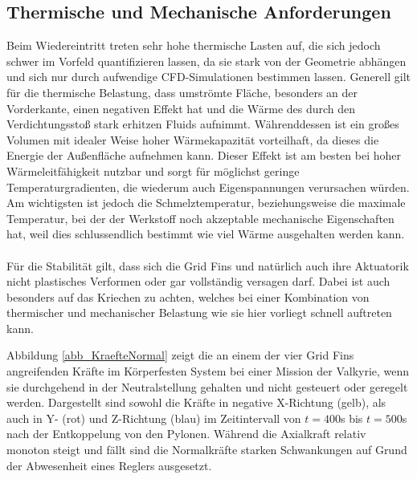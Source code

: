 \subsection{Thermische und Mechanische Anforderungen}
Beim Wiedereintritt treten sehr hohe thermische Lasten auf, die sich jedoch schwer im Vorfeld quantifizieren lassen, da sie stark von der Geometrie abhängen und sich nur durch aufwendige CFD-Simulationen bestimmen lassen. Generell gilt für die thermische Belastung, dass umströmte Fläche, besonders an der Vorderkante, einen negativen Effekt hat und die Wärme des durch den Verdichtungsstoß stark erhitzen Fluids aufnimmt. Währenddessen ist ein großes Volumen mit idealer Weise hoher Wärmekapazität vorteilhaft, da dieses die Energie der Außenfläche aufnehmen kann. Dieser Effekt ist am besten bei hoher Wärmeleitfähigkeit nutzbar und sorgt für möglichst geringe Temperaturgradienten, die wiederum auch Eigenspannungen verursachen würden. Am wichtigsten ist jedoch die Schmelztemperatur, beziehungsweise die maximale Temperatur, bei der der Werkstoff noch akzeptable mechanische Eigenschaften hat, weil dies schlussendlich bestimmt wie viel Wärme ausgehalten werden kann.
\\~\\
Für die Stabilität gilt, dass sich die Grid Fins und natürlich auch ihre Aktuatorik nicht plastisches Verformen oder gar vollständig versagen darf. Dabei ist auch besonders auf das Kriechen zu achten, welches bei einer Kombination von thermischer und mechanischer Belastung wie sie hier vorliegt schnell auftreten kann.

Abbildung \ref{abb_KraefteNormal} zeigt die an einem der vier Grid Fins angreifenden Kräfte im Körperfesten System bei einer Mission der Valkyrie, wenn sie durchgehend in der Neutralstellung gehalten und nicht gesteuert oder geregelt werden. Dargestellt sind sowohl die Kräfte in negative X-Richtung (gelb), als auch in Y- (rot) und Z-Richtung (blau) im Zeitintervall von $t=400$s bis $t=500$s nach der Entkoppelung von den Pylonen. Während die Axialkraft relativ monoton steigt und fällt sind die Normalkräfte starken Schwankungen auf Grund der Abwesenheit eines Reglers ausgesetzt.

